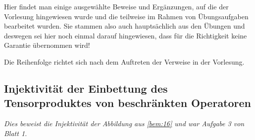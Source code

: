 Hier findet man einige ausgewählte Beweise und Ergänzungen, auf die der Vorlesung hingewiesen wurde und die teilweise im Rahmen von Übungsaufgaben bearbeitet wurden.
Sie stammen also auch hauptsächlich aus den Übungen und deswegen sei hier noch einmal darauf hingewiesen, dass für die Richtigkeit keine Garantie übernommen wird!

Die Reihenfolge richtet sich nach dem Auftreten der Verweise in der Vorlesung.

\subsection{Injektivität der Einbettung des Tensorproduktes von beschränkten Operatoren} %
\label{sub:injek_tensor_beschraenkte_operatoren}
\emph{Dies beweist die Injektivität der Abbildung aus \autoref{bem:16} und war Aufgabe 3 von Blatt 1.}\smallskip

